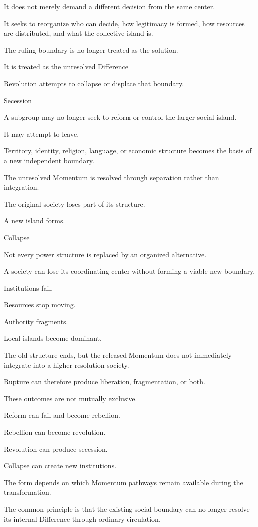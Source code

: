 It does not merely demand a different decision from the same center.

It seeks to reorganize who can decide, how legitimacy is formed, how resources are distributed, and what the collective island is.

The ruling boundary is no longer treated as the solution.

It is treated as the unresolved Difference.

Revolution attempts to collapse or displace that boundary.

Secession

A subgroup may no longer seek to reform or control the larger social island.

It may attempt to leave.

Territory, identity, religion, language, or economic structure becomes the basis of a new independent boundary.

The unresolved Momentum is resolved through separation rather than integration.

The original society loses part of its structure.

A new island forms.

Collapse

Not every power structure is replaced by an organized alternative.

A society can lose its coordinating center without forming a viable new boundary.

Institutions fail.

Resources stop moving.

Authority fragments.

Local islands become dominant.

The old structure ends, but the released Momentum does not immediately integrate into a higher-resolution society.

Rupture can therefore produce liberation, fragmentation, or both.

These outcomes are not mutually exclusive.

Reform can fail and become rebellion.

Rebellion can become revolution.

Revolution can produce secession.

Collapse can create new institutions.

The form depends on which Momentum pathways remain available during the transformation.

The common principle is that the existing social boundary can no longer resolve its internal Difference through ordinary circulation.

